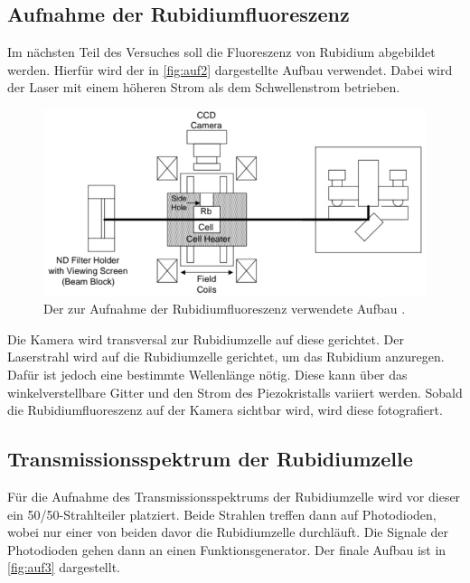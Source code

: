 \subsection{Aufnahme der Rubidiumfluoreszenz}

Im nächsten Teil des Versuches soll die Fluoreszenz von Rubidium abgebildet werden. Hierfür wird der in \autoref{fig:auf2} dargestellte Aufbau verwendet.
Dabei wird der Laser mit einem höheren Strom als dem Schwellenstrom betrieben.

\begin{figure}[H]
    \centering
    \includegraphics[width=\textwidth]{data/aufbau2.jpg}
    \caption{Der zur Aufnahme der Rubidiumfluoreszenz verwendete Aufbau \cite{Anleitung60}.}
    \label{fig:auf2}
\end{figure}
\noindent
Die Kamera wird transversal zur Rubidiumzelle auf diese gerichtet. Der Laserstrahl wird auf die Rubidiumzelle gerichtet, um das Rubidium anzuregen. Dafür ist jedoch eine
bestimmte Wellenlänge nötig. Diese kann über das winkelverstellbare Gitter und den Strom des Piezokristalls variiert werden. Sobald die Rubidiumfluoreszenz auf der Kamera sichtbar
wird, wird diese fotografiert.

\subsection{Transmissionsspektrum der Rubidiumzelle}

Für die Aufnahme des Transmissionsspektrums der Rubidiumzelle wird vor dieser ein 50/50-Strahlteiler platziert. Beide Strahlen treffen dann auf Photodioden, wobei nur einer von beiden
davor die Rubidiumzelle durchläuft. Die Signale der Photodioden gehen dann an einen Funktionsgenerator. Der finale Aufbau ist in \autoref{fig:auf3} dargestellt.

